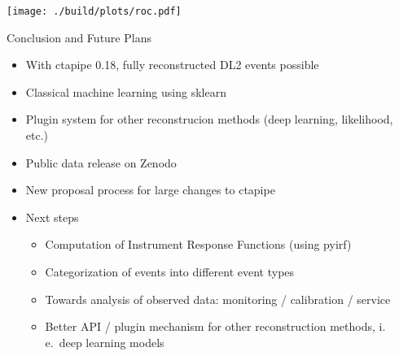 \documentclass[aspectratio=1610, 9pt]{beamer}
\begin{document}

\begin{frame}[c]
  \centering
  \texttt{[image: ./build/plots/roc.pdf]}
\end{frame}

\begin{frame}{Conclusion and Future Plans}
  \begin{itemize}
    \item With ctapipe 0.18, fully reconstructed DL2 events possible
    \item Classical machine learning using sklearn
    \item Plugin system for other reconstrucion methods (deep learning, likelihood, etc.)
    \item Public data release on Zenodo
    \item New proposal process for large changes to ctapipe
    \item Next steps
      \begin{itemize}
        \item Computation of Instrument Response Functions (using pyirf)
        \item Categorization of events into different event types
        \item Towards analysis of observed data: monitoring / calibration / service
        \item Better API / plugin mechanism for other reconstruction methods, i.\,e.\ deep learning models 
      \end{itemize}
  \end{itemize}
\end{frame}
\end{document}
